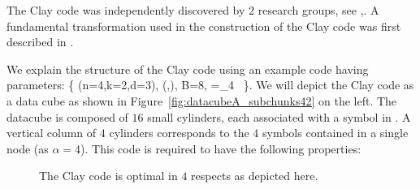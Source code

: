 \begin{multicols}{2}
 The Clay code was independently discovered by $2$ research groups, see \cite{YeBargPCTCode},\cite{SasVajhaKum16}.  A fundamental transformation used in the construction of the Clay code was first described in \cite{TianLiTangISIT17}. 
 
 We explain the structure of the Clay code using an example code having parameters:
 \bean
 \{ (n=4,k=2,d=3), (,), B=8, \fq=_4 \ \}. 
 \eean
 We will depict the Clay code as a data cube as shown in Figure~\ref{fig:datacubeA_subchunks42} on the left.  The datacube is composed of $16$ small cylinders, each associated with a symbol in \fq.  A vertical column of $4$ cylinders corresponds to the $4$ symbols contained in a single node (as $\alpha=4$). This code is required to have the following properties:

 \begin{figure}[H]
 	\centering
 		\caption{The Clay code is optimal in $4$ respects as depicted here.}  \label{fig:4way_optimality}  
 \end{figure}


\end{multicols}
